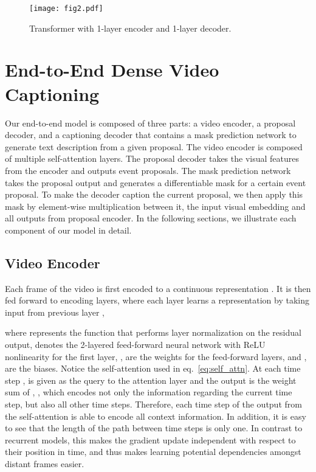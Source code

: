 \documentclass[10pt,twocolumn,letterpaper]{article}
\begin{document}
\begin{figure}[t]
\centering 
  \texttt{[image: fig2.pdf]}
    \vspace{-10pt}
       \caption{Transformer with 1-layer encoder and 1-layer decoder.}
    \vspace{-10pt}
\label{fig:transformer}
\end{figure}

\section{End-to-End Dense Video Captioning}
\label{sec:end-to-end}
Our end-to-end model is composed of three parts: a video encoder, a proposal decoder, and a captioning decoder that contains a mask prediction network to generate text description from a given proposal. The video encoder is composed of multiple self-attention layers. The proposal decoder takes the visual features from the encoder and outputs event proposals. The mask prediction network takes the proposal output and generates a differentiable mask for a certain event proposal. To make the decoder caption the current proposal, we then apply this mask by element-wise multiplication between it, the input visual embedding and all outputs from proposal encoder. In the following sections, we illustrate each component of our model in detail.

\subsection{Video Encoder} 
\label{sec:encoder}
Each frame  of the video  is first encoded to a continuous representation . It is then fed forward to  encoding layers, where each layer learns a representation  by taking input from previous layer ,


where  represents the function that performs layer normalization on the residual output,  denotes the 2-layered feed-forward neural network with ReLU nonlinearity for the first layer, ,  are the weights for the feed-forward layers, and ,  are the biases. Notice the self-attention used in eq.~\ref{eq:self_attn}. At each time step ,  is given as the query to the attention layer and the output is the weight sum of , , which encodes not only the information regarding the current time step, but also all other time steps. Therefore, each time step of the output from the self-attention is able to encode all context information. In addition, it is easy to see that the length of the path between time steps is only one. In contrast to recurrent models, this makes the gradient update independent with respect to their position in time, and thus makes learning potential dependencies amongst distant frames easier. 
\end{document}
